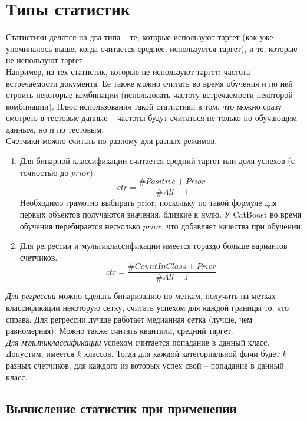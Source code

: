 \documentclass[a4paper,12pt]{article}
\begin{document}
\section{Типы статистик}

Статистики делятся на два типа – те, которые используют таргет (как уже упоминалось выше, когда считается среднее, используется таргет), и те, которые не используют таргет. \\

Например, из тех статистик, которые не используют таргет: частота встречаемости документа. Ее также можно считать во время обучения и по ней строить некоторые комбинации (использовать частоту встречаемости некоторой комбинации). Плюс использования такой статистики в том, что можно сразу смотреть в тестовые данные – частоты будут считаться не только по обучающим данным, но и по тестовым. \\

Счетчики можно считать по-разному для разных режимов.
\begin{enumerate}[noitemsep]
\item Для бинарной классификации считается средний таргет или доля успехов (с точностью до $prior$):
$$ctr=\frac{\#Positive+Prior}{\#All+1}$$
Необходимо грамотно выбирать prior, поскольку по такой формуле для первых объектов получаются значения, близкие к нулю. У CatBoost во время обучения перебирается несколько $prior$, что добавляет качества при обучении. 
\item Для регрессии и мультиклассификации имеется гораздо больше вариантов счетчиков. 
$$ctr=\frac{\#CountInClass+Prior}{\#All+1}$$
\end{enumerate}

\textit{Для регрессии} можно сделать бинаризацию по меткам, получить на метках классификации некоторую сетку, считать успехом для каждой границы то, что справа. Для регрессии лучше работает медианная сетка (лучше, чем равномерная). 
Можно также считать квантили, средний таргет. \\

\textit{Для мультиклассификации} успехом считается попадание в данный класс. Допустим, имеется $k$ классов. Тогда для каждой категориальной фичи будет $k$ разных счетчиков, для каждого из которых успех свой – попадание в данный класс. 

\subsection{Вычисление статистик при применении}
\end{document}
